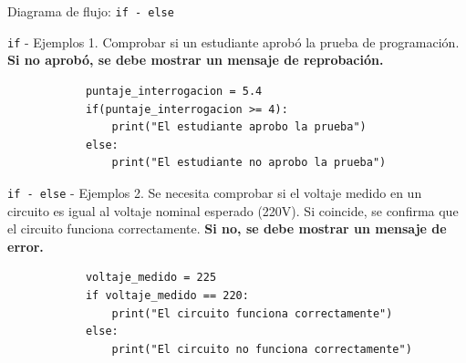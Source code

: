 \documentclass{beamer}
\begin{document}
    \begin{frame}{Diagrama de flujo: \texttt{if - else}}
        \centering
    \end{frame}

    \begin{frame}[fragile,t]{\texttt{if} - Ejemplos}
        1. Comprobar si un estudiante aprobó la prueba de programación. 
        \textbf{Si no aprobó, se debe mostrar un mensaje de reprobación.}
        
        \begin{verbatim}
            puntaje_interrogacion = 5.4
            if(puntaje_interrogacion >= 4):
                print("El estudiante aprobo la prueba")
            else:
                print("El estudiante no aprobo la prueba")
        \end{verbatim}
    \end{frame}

    \begin{frame}[fragile,t]{\texttt{if - else} - Ejemplos}
        2. Se necesita comprobar si el voltaje medido en un circuito es igual al voltaje nominal 
        esperado (220V). Si coincide, se confirma que el circuito funciona correctamente. \textbf{Si no, 
        se debe mostrar un mensaje de error.}
        \begin{verbatim}
            voltaje_medido = 225
            if voltaje_medido == 220:
                print("El circuito funciona correctamente")
            else:
                print("El circuito no funciona correctamente")
        \end{verbatim}
    \end{frame}
\end{document}

